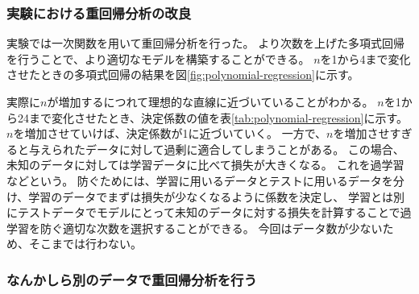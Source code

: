 \documentclass[../../../main]{subfiles}
\begin{document}
\subsubsection{実験における重回帰分析の改良}
実験では一次関数を用いて重回帰分析を行った。
より次数を上げた多項式回帰を行うことで、より適切なモデルを構築することができる。
$n$を1から4まで変化させたときの多項式回帰の結果を図\ref{fig:polynomial-regression}に示す。

実際に$n$が増加するにつれて理想的な直線に近づいていることがわかる。
$n$を1から24まで変化させたとき、決定係数の値を表\ref{tab:polynomial-regression}に示す。
$n$を増加させていけば、決定係数が1に近づいていく。
一方で、$n$を増加させすぎると与えられたデータに対して過剰に適合してしまうことがある。
この場合、未知のデータに対しては学習データに比べて損失が大きくなる。
これを過学習などという。
防ぐためには、学習に用いるデータとテストに用いるデータを分け、学習のデータでまずは損失が少なくなるように係数を決定し、
学習とは別にテストデータでモデルにとって未知のデータに対する損失を計算することで過学習を防ぐ適切な次数を選択することができる。
今回はデータ数が少ないため、そこまでは行わない。


\subsubsection{なんかしら別のデータで重回帰分析を行う}
\end{document}
